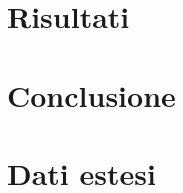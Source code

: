 \documentclass[
    reprint, 
    superscriptaddress, 
    altaffilletter, 
    amsmath, 
    amssymb, 
    a4paper]{revtex4-2}
\begin{document}
\section{Risultati}
\label{section:results}

\section{Conclusione}
\label{section:conclusion}

\appendix

\setcounter{table}{0}
\renewcommand{\thetable}{A-\Roman{table}}

\section{Dati estesi}
\end{document}
